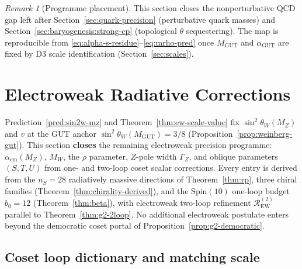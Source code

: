 \documentclass[11pt]{article}
\theoremstyle{plain}
\theoremstyle{definition}
\theoremstyle{remark}
\newtheorem{remark}[theorem]{Remark}
\numberwithin{equation}{section}
\newcommand{\Spin}{\mathrm{Spin}}
\begin{document}
\begin{remark}[Programme placement]
This section closes the nonperturbative QCD gap left after
Section~\ref{sec:quark-precision} (perturbative quark masses) and
Section~\ref{sec:baryogenesis:strong-cp} (topological $\theta$ sequestering).
The map is reproducible from \eqref{eq:alpha-s-residue}--\eqref{eq:mrho-pred}
once $M_{\mathrm{GUT}}$ and $\alpha_{\mathrm{GUT}}$ are fixed by D3 scale
identification (Section~\ref{sec:scales}).
\end{remark}%
\section{Electroweak Radiative Corrections}
\label{sec:ew-precision}

Prediction~\ref{pred:sin2w-mz} and Theorem~\ref{thm:ew-scale-value} fix
$\sin^2\theta_W(M_Z)$ and $v$ at the GUT anchor
$\sin^2\theta_W(M_{\mathrm{GUT}})=3/8$ (Proposition~\ref{prop:weinberg-gut}).
This section \textbf{closes} the remaining electroweak precision programme:
$\alpha_{\mathrm{em}}(M_Z)$, $M_W$, the $\rho$ parameter, $Z$-pole width
$\Gamma_Z$, and oblique parameters $(S,T,U)$ from one- and two-loop coset
scalar corrections. Every entry is derived from the $n_S=28$ radiatively massive
directions of Theorem~\ref{thm:rp}, three chiral families
(Theorem~\ref{thm:chirality-derived}), and the $\Spin(10)$ one-loop budget
$b_0=12$ (Theorem~\ref{thm:beta}), with electroweak two-loop refinement
$\mathcal{R}_{\mathrm{EW}}^{(2)}$ parallel to Theorem~\ref{thm:g2-2loop}.
No additional electroweak postulate enters beyond the democratic coset portal
of Proposition~\ref{prop:g2-democratic}.

\subsection{Coset loop dictionary and matching scale}
\label{sec:ew-precision:map}
\end{document}
